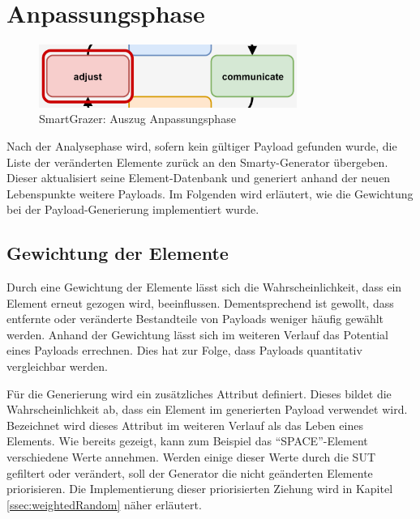 \section{Anpassungsphase}

\begin{figure}[htbp] 
	\centering
	\includegraphics[width=0.75\textwidth]{contents/images/SmartGrazerSectionAdjust}
	\caption{SmartGrazer: Auszug Anpassungsphase}
	\label{fig:SmartGrazerSectionAdjust}
\end{figure}

Nach der Analysephase wird, sofern kein gültiger Payload gefunden wurde, die Liste der veränderten Elemente zurück an den Smarty-Generator übergeben. Dieser aktualisiert seine Element-Datenbank und generiert anhand der neuen Lebenspunkte weitere Payloads. Im Folgenden wird erläutert, wie die Gewichtung bei der Payload-Generierung implementiert wurde.

\subsection{Gewichtung der Elemente}\label{ssec:elementlifepoints}

Durch eine Gewichtung der Elemente lässt sich die Wahrscheinlichkeit, dass ein Element erneut gezogen wird, beeinflussen. Dementsprechend ist gewollt, dass entfernte oder veränderte Bestandteile von Payloads weniger häufig gewählt werden. Anhand der Gewichtung lässt sich im weiteren Verlauf das Potential eines Payloads errechnen. Dies hat zur Folge, dass Payloads quantitativ vergleichbar werden.

Für die Generierung wird ein zusätzliches Attribut definiert. Dieses bildet die Wahrscheinlichkeit ab, dass ein Element im generierten Payload verwendet wird. Bezeichnet wird dieses Attribut im weiteren Verlauf als das Leben eines Elements. Wie bereits gezeigt, kann zum Beispiel das ``SPACE''-Element verschiedene Werte annehmen. Werden einige dieser Werte durch die SUT gefiltert oder verändert, soll der Generator die nicht geänderten Elemente priorisieren. Die Implementierung dieser priorisierten Ziehung wird in Kapitel \ref{ssec:weightedRandom} näher erläutert.

